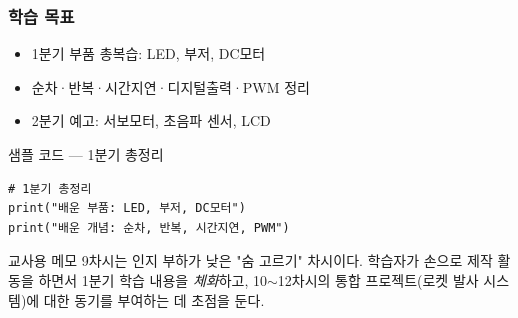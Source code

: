 \begin{storybox}
\end{storybox}

\subsubsection*{학습 목표}
\begin{itemize}[leftmargin=1.4em]
  \item 1분기 부품 총복습: LED, 부저, DC모터
  \item 순차·반복·시간지연·디지털출력·PWM 정리
  \item 2분기 예고: 서보모터, 초음파 센서, LCD
\end{itemize}

\begin{labbox}{샘플 코드 --- 1분기 총정리}
\begin{verbatim}
# 1분기 총정리
print("배운 부품: LED, 부저, DC모터")
print("배운 개념: 순차, 반복, 시간지연, PWM")
\end{verbatim}
\end{labbox}

\begin{notebox}{교사용 메모}
9차시는 인지 부하가 낮은 "숨 고르기" 차시이다. 학습자가 손으로
제작 활동을 하면서 1분기 학습 내용을 \emph{체화}하고, 10$\sim$12차시의
통합 프로젝트(로켓 발사 시스템)에 대한 동기를 부여하는 데 초점을 둔다.
\end{notebox}
